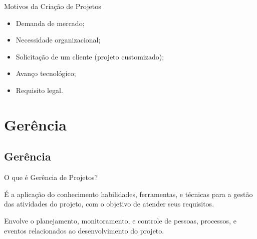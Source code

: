 \documentclass[xcolor=x11names,compress]{beamer}
\begin{document}
\begin{frame}{Motivos da Criação de Projetos}

\begin{itemize}
\itemsep 5mm

\item Demanda de mercado;

\item Necessidade organizacional;

\item Solicitação de um cliente (projeto customizado);

\item Avanço tecnológico;

\item Requisito legal.

\end{itemize}

\end{frame}

\section{Gerência}
\subsection{Gerência}

\begin{frame}{O que é Gerência de Projetos?}

\begin{block}{}

É a aplicação do conhecimento habilidades, ferramentas, e técnicas para a gestão das atividades do projeto, com o objetivo de atender seus requisitos.
\end{block}

\pause

\begin{block}{}
Envolve o planejamento, monitoramento, e controle de pessoas, processos, e eventos relacionados ao desenvolvimento do projeto.
\end{block}

\end{frame}
\end{document}
